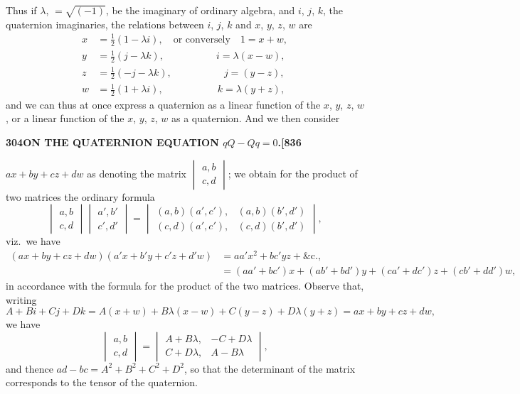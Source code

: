 \documentclass[11pt,a4paper]{book}
\begin{document}
Thus if $\lambda$, $=\sqrt{(-1)}$, be the imaginary of ordinary algebra, and $i$, $j$, $k$, the quaternion imaginaries, the relations between $i$, $j$, $k$ and $x$, $y$, $z$, $w$ are
\begin{align*}
x &= \tfrac{1}{2}(1 - \lambda i), \quad \text{or conversely} \quad 1 = x + w, \\
y &= \tfrac{1}{2}(j - \lambda k), \qquad\qquad\quad\ i = \lambda(x - w), \\
z &= \tfrac{1}{2}(-j - \lambda k), \qquad\qquad\quad\ j = (y - z), \\
w &= \tfrac{1}{2}(1 + \lambda i), \qquad\qquad\quad\ \ k = \lambda(y + z),
\end{align*}
and we can thus at once express a quaternion as a linear function of the $x$, $y$, $z$, $w$, or a linear function of the $x$, $y$, $z$, $w$ as a quaternion. And we then consider

\newpage
\setcounter{page}{304}

\noindent\textbf{304}\hfill\textbf{ON THE QUATERNION EQUATION $qQ - Qq = 0$.}\hfill\textbf{[836}

\bigskip

\noindent $ax + by + cz + dw$ as denoting the matrix $\begin{vmatrix} a, b \\ c, d \end{vmatrix}$; we obtain for the product of two matrices the ordinary formula
\[
\begin{vmatrix} a, b \\ c, d \end{vmatrix} \begin{vmatrix} a', b' \\ c', d' \end{vmatrix} = \begin{vmatrix} (a, b)(a', c'), & (a, b)(b', d') \\ (c, d)(a', c'), & (c, d)(b', d') \end{vmatrix},
\]
viz.\ we have
\begin{align*}
(ax + by + cz + dw)(a'x + b'y + c'z + d'w) &= aa'x^2 + bc'yz + \&\text{c.}, \\
&= (aa' + bc')x + (ab' + bd')y + (ca' + dc')z + (cb' + dd')w,
\end{align*}
in accordance with the formula for the product of the two matrices. Observe that, writing
\[
A + Bi + Cj + Dk = A(x + w) + B\lambda(x - w) + C(y - z) + D\lambda(y + z) = ax + by + cz + dw,
\]
we have
\[
\begin{vmatrix} a, b \\ c, d \end{vmatrix} = \begin{vmatrix} A + B\lambda, & -C + D\lambda \\ C + D\lambda, & A - B\lambda \end{vmatrix},
\]
and thence $ad - bc = A^2 + B^2 + C^2 + D^2$, so that the determinant of the matrix corresponds to the tensor of the quaternion.
\end{document}

